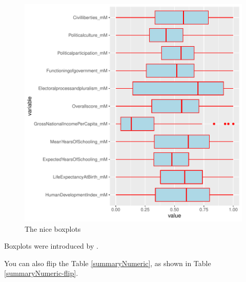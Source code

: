 \documentclass[a4paper, 12pt]{article}
\begin{document}
\begin{figure}[h]
\centering
\begin{adjustbox}{width=12cm,height=8.5cm,clip,trim=0cm 0.5cm 0cm 0cm} 
\includegraphics{WorkInR_forPrinter-numBoxplot}
\end{adjustbox}
\caption{The nice boxplots}  
\label{numBoxplot} 
\end{figure}


Boxplots were introduced by \citet{tukey_exploratory_1977}.

You can also flip the Table \ref{summaryNumeric}, as shown in Table \ref{summaryNumeric-flip}.
\end{document}
